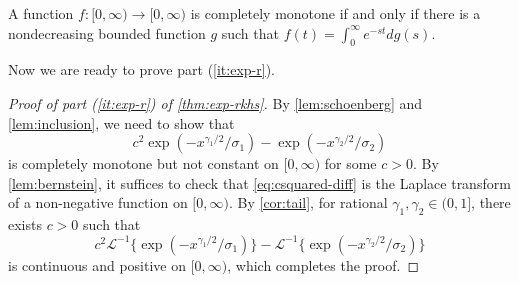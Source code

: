 \documentclass[11pt]{article}
\newcommand{\la}{\mathscr{L}}
\begin{document}
\begin{lemma}\label{lem:bernstein}
A function $f:[0,\infty)\to [0,\infty)$ is completely monotone if and only if there is a nondecreasing bounded function $g$ such that $f(t) = \int_0^\infty e^{-st} dg(s)$. 
\end{lemma}

Now we are ready to prove part (\ref{it:exp-r}).

\begin{proof}[Proof of part (\ref{it:exp-r}) of \cref{thm:exp-rkhs}]
By \cref{lem:schoenberg} and \cref{lem:inclusion}, we need to show that 
\begin{equation}\label{eq:csquared-diff}
    c^2 \exp(-x^{\gamma_1/2}/\sigma_1) - \exp(-x^{\gamma_2/2}/\sigma_2)
\end{equation}
 is completely monotone but not constant on $[0,\infty)$ for some $c>0$. By \cref{lem:bernstein}, it suffices to check that \eqref{eq:csquared-diff} is the Laplace transform of a non-negative function on $[0,\infty)$. By \cref{cor:tail}, for rational $\gamma_1,\gamma_2\in (0,1]$, there exists $c>0$ such that \[
 c^2 \la^{-1}\{\exp(-x^{\gamma_1/2}/\sigma_1)\} - \la^{-1}\{\exp(-x^{\gamma_2/2}/\sigma_2)\}
 \]
 is continuous and positive on $[0,\infty)$, which completes the proof.
\end{proof}
\end{document}
